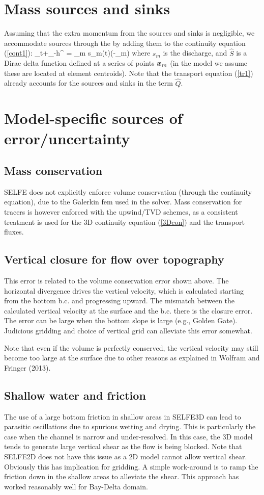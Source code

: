 


\section{Mass sources and sinks}
\label{sec-source}
Assuming that the extra momentum from the sources and sinks is negligible, 
we accommodate sources through the by adding them to the continuity equation (\ref{cont1}):
\beq
  \eta_t+\nabla \cdot \int_{-h}^\eta {}  = \sum_m s_m(t)(-_m) \label{cont2}
\eeq
where $s_m$ is the discharge, and $\hat{S}$ is a Dirac delta function defined at a series of points $\boldsymbol{x}_m$ (in the model we
assume these are located at element centroids). Note that the transport equation (\ref{tr1}) already accounts for the sources and sinks in the term $\hat{Q}$.


\section{Model-specific sources of error/uncertainty}
  \subsection{Mass conservation}
    SELFE does not explicitly enforce volume conservation (through the continuity equation), 
		due to the Galerkin \gls{fem} used in the solver. Mass
conservation for tracers is however enforced with the upwind/TVD schemes, as a consistent treatment is used for the 3D continuity
equation (\ref{3Dcon}) and the transport fluxes.
	\subsection{Vertical closure for flow over topography}
    This error is related to the volume conservation error shown above. The horizontal divergence drives the vertical velocity, which is calculated starting from the bottom b.c. and progressing upward. The mismatch between the calculated vertical
velocity at the surface and the b.c. there is the closure error. The error can be large when the bottom slope is large (e.g., Golden
Gate). Judicious gridding and choice of vertical grid can alleviate this error somewhat. 

   Note that even if the volume is perfectly conserved, the vertical velocity may still become too large at the surface due to other
reasons as explained in Wolfram and Fringer (2013).
	\subsection{Shallow water and friction}
    The use of a large bottom friction in shallow areas in SELFE3D can lead to parasitic oscillations due to spurious wetting and
drying. This is particularly the case when the channel is narrow and under-resolved. In this case, the 3D model tends to generate
large vertical shear as the flow is being blocked. Note that SELFE2D does not have this issue as a 2D model cannot allow vertical
shear. 
    Obviously this has implication for gridding. A simple work-around is to ramp the friction down in the shallow areas to alleviate
the shear. This approach has worked reasonably well for Bay-Delta domain. 
